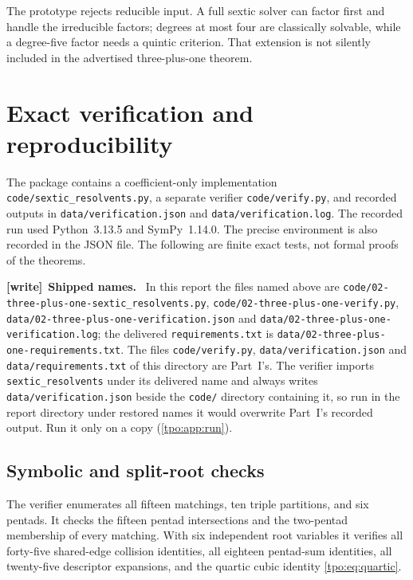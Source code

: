 \documentclass[11pt,letterpaper]{article}
\numberwithin{equation}{section}
\theoremstyle{definition}
\theoremstyle{remark}
\newcommand{\src}[1]{\texttt{\nolinkurl{#1}}}
\newenvironment{writenote}[1][]{\par\smallskip\begingroup\small
 \noindent\textbf{[write]}\if\relax\detokenize{#1}\relax\else~\textbf{#1.}\fi\ }%
 {\par\endgroup\smallskip}
\begin{document}
The prototype rejects reducible input. A full sextic solver can factor first
and handle the irreducible factors; degrees at most four are classically
solvable, while a degree-five factor needs a quintic criterion. That extension
is not silently included in the advertised three-plus-one theorem.

\section{Exact verification and reproducibility}
\label{tpo:sec:verification}

The package contains a coefficient-only implementation
\src{code/sextic_resolvents.py}, a separate verifier \src{code/verify.py}, and
recorded outputs in \src{data/verification.json} and
\src{data/verification.log}. The recorded run used Python~3.13.5 and
SymPy~1.14.0. The precise environment is also recorded in the JSON file.
The following are finite exact tests, not formal proofs of the theorems.

\begin{writenote}[Shipped names]
In this report the files named above are
\src{code/02-three-plus-one-sextic_resolvents.py},
\src{code/02-three-plus-one-verify.py},
\src{data/02-three-plus-one-verification.json} and
\src{data/02-three-plus-one-verification.log}; the delivered
\src{requirements.txt} is \src{data/02-three-plus-one-requirements.txt}.
The files \src{code/verify.py}, \src{data/verification.json} and
\src{data/requirements.txt} of this directory are Part~I's. The verifier
imports \src{sextic_resolvents} under its delivered name and always writes
\src{data/verification.json} beside the \src{code/} directory containing
it, so run in the report directory under restored names it would overwrite
Part~I's recorded output. Run it only on a copy (\cref{tpo:app:run}).
\end{writenote}

\subsection{Symbolic and split-root checks}
The verifier enumerates all fifteen matchings, ten triple partitions, and six
pentads. It checks the fifteen pentad intersections and the two-pentad
membership of every matching. With six independent root variables it verifies
all forty-five shared-edge collision identities, all eighteen pentad-sum
identities, all twenty-five descriptor expansions, and the quartic cubic
identity \eqref{tpo:eq:quartic}.
\end{document}
